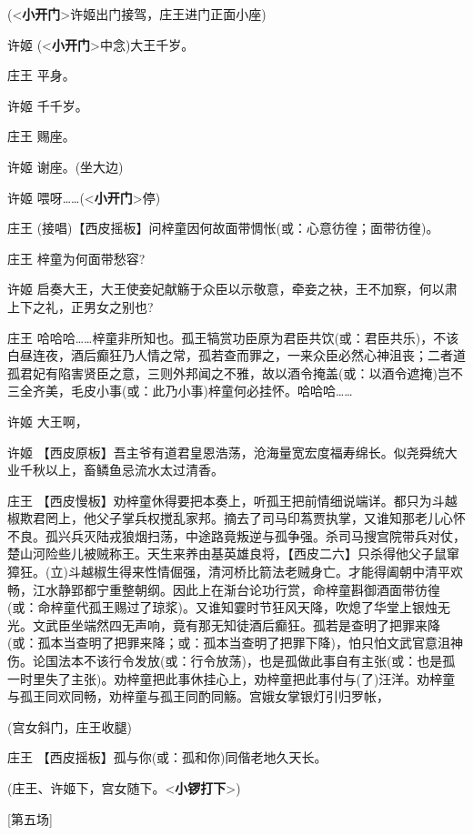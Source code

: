 (\textless{}\textbf{小开门}\textgreater{}许姬出门接驾，庄王进门正面小座)

许姬 (\textless{}\textbf{小开门}\textgreater{}中念)大王千岁。

庄王 平身。

许姬 千千岁。

庄王 赐座。

许姬 谢座。(坐大边)

许姬 喂呀\ldots{}\ldots{}(\textless{}\textbf{小开门}\textgreater{}停)

庄王 (接唱)【西皮摇板】问梓童因何故面带惆怅(或：心意彷徨；面带彷徨)。

庄王 梓童为何面带愁容?

许姬
启奏大王，大王使妾妃献觞于众臣以示敬意，牵妾之袂，王不加察，何以肃上下之礼，正男女之别也?

庄王
哈哈哈\ldots{}\ldots{}梓童非所知也。孤王犒赏功臣原为君臣共饮(或：君臣共乐)，不该白昼连夜，酒后癫狂乃人情之常，孤若查而罪之，一来众臣必然心神沮丧；二者道孤君妃有陷害贤臣之意，三则外邦闻之不雅，故以酒令掩盖(或：以酒令遮掩)岂不三全齐美，毛皮小事(或：此乃小事)梓童何必挂怀。哈哈哈\ldots{}\ldots{}

许姬 大王啊，

许姬
【西皮原板】吾主爷有道君皇恩浩荡，沧海量宽宏度福寿绵长。似尧舜统大业千秋以上，畜鳞鱼忌流水太过清香。

庄王
【西皮慢板】劝梓童休得要把本奏上，听孤王把前情细说端详。都只为斗越椒欺君罔上，他父子掌兵权搅乱家邦。摘去了司马印蒍贾执掌，又谁知那老儿心怀不良。孤兴兵灭陆戎狼烟扫荡，中途路竟叛逆与孤争强。杀司马搜宫院带兵对仗，楚山河险些儿被贼称王。天生来养由基英雄良将，【西皮二六】只杀得他父子鼠窜獐狂。(立)斗越椒生得来性情倔强，清河桥比箭法老贼身亡。才能得阖朝中清平欢畅，江水静郢都宁重整朝纲。因此上在渐台论功行赏，命梓童斟御酒面带彷徨(或：命梓童代孤王赐过了琼浆)。又谁知霎时节狂风天降，吹熄了华堂上银烛无光。文武臣坐端然四无声响，竟有那无知徒酒后癫狂。孤若是查明了把罪来降(或：孤本当查明了把罪来降；或：孤本当查明了把罪下降)，怕只怕文武官意沮神伤。论国法本不该行令发放(或：行令放荡)，也是孤做此事自有主张(或：也是孤一时里失了主张)。劝梓童把此事休挂心上，劝梓童把此事付与(了)汪洋。劝梓童与孤王同欢同畅，劝梓童与孤王同酌同觞。宫娥女掌银灯引归罗帐，

(宫女斜门，庄王收腿)

庄王 【西皮摇板】孤与你(或：孤和你)同偕老地久天长。

(庄王、许姬下，宫女随下。\textless{}\textbf{小锣打下}\textgreater{})

{[}第五场{]}

